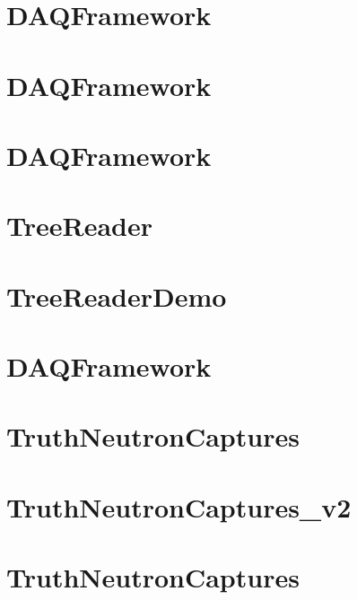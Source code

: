 \let\mypdfximage\pdfximage\def\pdfximage{\immediate\mypdfximage}\documentclass[twoside]{book}
\newcommand{\+}{\discretionary{\mbox{\scriptsize$\hookleftarrow$}}{}{}}
\begin{document}
\chapter{DAQFramework}
\label{md_UserTools_SLESearch_README}

\chapter{DAQFramework}
\label{md_UserTools_template_README}

\chapter{DAQFramework}
\label{md_UserTools_TestTool_README}

\chapter{Tree\+Reader}
\label{md_UserTools_TreeReader_README}

\chapter{Tree\+Reader\+Demo}
\label{md_UserTools_TreeReaderDemo_README}

\chapter{DAQFramework}
\label{md_UserTools_TrueNCaptures_README}

\chapter{Truth\+Neutron\+Captures}
\label{md_UserTools_TruthNeutronCaptures_README}

\chapter{Truth\+Neutron\+Captures\+\_\+v2}
\label{md_UserTools_TruthNeutronCaptures_v2_README}

\chapter{Truth\+Neutron\+Captures}
\label{md_UserTools_TruthNeutronCaptures_v3_README}

\end{document}
